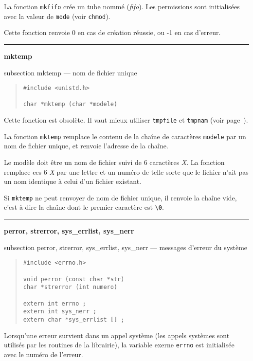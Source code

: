 \documentclass [twoside] {report}
\newcommand {\primitive} [1]
    {
	{\large \bf #1}
	\addcontentsline {toc} {subsection} {#1}
    }
\newcommand {\separation}
    {
	\vspace {7mm}
	\nopagebreak
	\hrule
    }
\begin{document}
La fonction {\tt mkfifo} crée un tube nommé ({\em fifo}).
Les permissions sont initialisées avec la valeur de {\tt mode}
(voir {\tt chmod}).

Cette fonction renvoie 0 en cas de création
réussie, ou -1 en cas d'erreur.




\separation 
\primitive {mktemp} --- nom de fichier unique

\begin {quote}
\begin {verbatim}
#include <unistd.h>

char *mktemp (char *modele)
\end{verbatim}
\end {quote}

Cette fonction est obsolète. Il vaut mieux utiliser {\tt tmpfile} et
{\tt tmpnam} (voir page~\pageref {tmpfile}).

La fonction {\tt mktemp} remplace le contenu de la chaîne de
caractères {\tt modele} par un nom de fichier unique, et
renvoie l'adresse de la chaîne.

Le modèle doit être un nom de fichier suivi de 6 caractères
{\it X}. La fonction remplace ces 6 {\it X} par une lettre et un
numéro de telle sorte que le fichier n'ait pas un nom
identique à celui d'un fichier existant.

Si {\tt mktemp} ne peut renvoyer de nom de fichier unique, il
renvoie la chaîne vide, c'est-à-dire la chaîne dont le
premier caractère est \verb:\0:.




\separation 
\primitive {perror, strerror, sys\_errlist, sys\_nerr} --- messages d'erreur du système

\begin {quote}
\begin {verbatim}
#include <errno.h>

void perror (const char *str)
char *strerror (int numero)

extern int errno ;
extern int sys_nerr ;
extern char *sys_errlist [] ;
\end{verbatim}
\end {quote}

Lorsqu'une erreur survient dans un appel système (les
appels systèmes sont utilisés par les routines de la
librairie), la variable exerne {\tt errno} est initialisée avec
le numéro de l'erreur.
\end{document}
